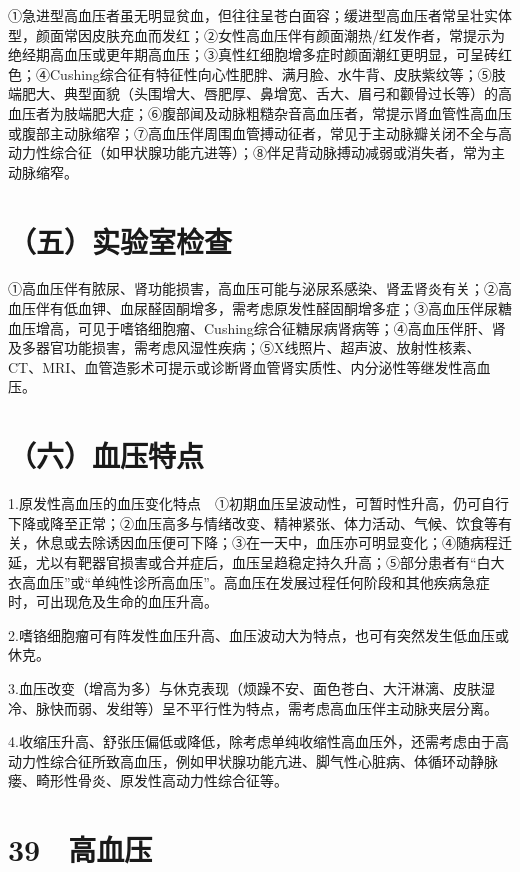 ①急进型高血压者虽无明显贫血，但往往呈苍白面容；缓进型高血压者常呈壮实体型，颜面常因皮肤充血而发红；②女性高血压伴有颜面潮热/红发作者，常提示为绝经期高血压或更年期高血压；③真性红细胞增多症时颜面潮红更明显，可呈砖红色；④Cushing综合征有特征性向心性肥胖、满月脸、水牛背、皮肤紫纹等；⑤肢端肥大、典型面貌（头围增大、唇肥厚、鼻增宽、舌大、眉弓和颧骨过长等）的高血压者为肢端肥大症；⑥腹部闻及动脉粗糙杂音高血压者，常提示肾血管性高血压或腹部主动脉缩窄；⑦高血压伴周围血管搏动征者，常见于主动脉瓣关闭不全与高动力性综合征（如甲状腺功能亢进等）；⑧伴足背动脉搏动减弱或消失者，常为主动脉缩窄。

\section{（五）实验室检查}

①高血压伴有脓尿、肾功能损害，高血压可能与泌尿系感染、肾盂肾炎有关；②高血压伴有低血钾、血尿醛固酮增多，需考虑原发性醛固酮增多症；③高血压伴尿糖血压增高，可见于嗜铬细胞瘤、Cushing综合征糖尿病肾病等；④高血压伴肝、肾及多器官功能损害，需考虑风湿性疾病；⑤X线照片、超声波、放射性核素、CT、MRI、血管造影术可提示或诊断肾血管肾实质性、内分泌性等继发性高血压。

\section{（六）血压特点}

1.原发性高血压的血压变化特点　①初期血压呈波动性，可暂时性升高，仍可自行下降或降至正常；②血压高多与情绪改变、精神紧张、体力活动、气候、饮食等有关，休息或去除诱因血压便可下降；③在一天中，血压亦可明显变化；④随病程迁延，尤以有靶器官损害或合并症后，血压呈趋稳定持久升高；⑤部分患者有“白大衣高血压”或“单纯性诊所高血压”。高血压在发展过程任何阶段和其他疾病急症时，可出现危及生命的血压升高。

2.嗜铬细胞瘤可有阵发性血压升高、血压波动大为特点，也可有突然发生低血压或休克。

3.血压改变（增高为多）与休克表现（烦躁不安、面色苍白、大汗淋漓、皮肤湿冷、脉快而弱、发绀等）呈不平行性为特点，需考虑高血压伴主动脉夹层分离。

4.收缩压升高、舒张压偏低或降低，除考虑单纯收缩性高血压外，还需考虑由于高动力性综合征所致高血压，例如甲状腺功能亢进、脚气性心脏病、体循环动静脉瘘、畸形性骨炎、原发性高动力性综合征等。

\protect\hypertarget{text00108.html}{}{}

\section{39　高血压}

